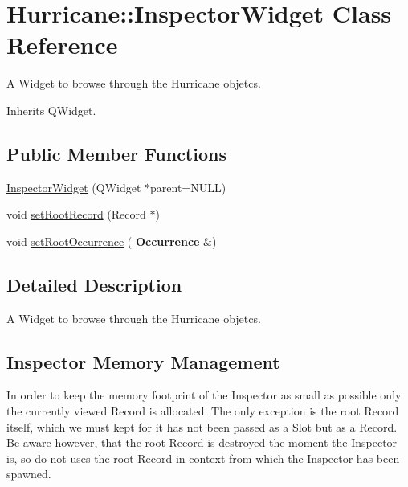 \hypertarget{classHurricane_1_1InspectorWidget}{}\section{Hurricane\+:\+:Inspector\+Widget Class Reference}
\label{classHurricane_1_1InspectorWidget}


A Widget to browse through the Hurricane objetcs.  




Inherits Q\+Widget.

\subsection*{Public Member Functions}
\begin{DoxyCompactItemize}
\item 
\mbox{\hyperlink{classHurricane_1_1InspectorWidget_a6071f331a8d27bf45103aa91981e4ebb}{Inspector\+Widget}} (Q\+Widget $\ast$parent=N\+U\+LL)
\item 
void \mbox{\hyperlink{classHurricane_1_1InspectorWidget_aebc3241d7cf15d3e2ca7478c278c6a35}{set\+Root\+Record}} (Record $\ast$)
\item 
void \mbox{\hyperlink{classHurricane_1_1InspectorWidget_a79914005284bdc8426c90f3440714bb4}{set\+Root\+Occurrence}} (\textbf{ Occurrence} \&)
\end{DoxyCompactItemize}


\subsection{Detailed Description}
A Widget to browse through the Hurricane objetcs. 

\hypertarget{classHurricane_1_1InspectorWidget_secInspectorMM}{}\subsection{Inspector Memory Management}\label{classHurricane_1_1InspectorWidget_secInspectorMM}
In order to keep the memory footprint of the Inspector as small as possible only the currently viewed Record is allocated. The only exception is the root Record itself, which we must kept for it has not been passed as a Slot but as a Record. Be aware however, that the root Record is destroyed the moment the Inspector is, so do not uses the root Record in context from which the Inspector has been spawned.


